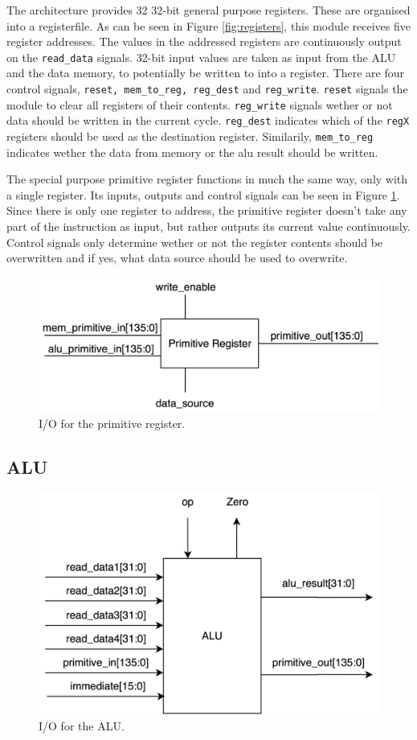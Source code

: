 The \vthreek architecture provides 32 32-bit general purpose registers.
These are organised into a registerfile.
As can be seen in Figure \ref{fig:registers}, this module receives five register addresses.
The values in the addressed registers are continuously output on the \texttt{read\_data} signals.
32-bit input values are taken as input from the ALU and the data memory, to potentially be written to into a register.
There are four control signals, \texttt{reset, mem\_to\_reg, reg\_dest} and \texttt{reg\_write}.
\texttt{reset} signals the module to clear all registers of their contents.
\texttt{reg\_write} signals wether or not data should be written in the current cycle.
\texttt{reg\_dest} indicates which of the \texttt{regX} registers should be used as the destination register.
Similarily, \texttt{mem\_to\_reg} indicates wether the data from memory or the alu result should be written.

The special purpose primitive register functions in much the same way, only with a single register.
Its inputs, outputs and control signals can be seen in Figure \ref{fig:primitive-register}.
Since there is only one register to address, the primitive register doesn't take any part of the instruction as input, but rather outputs its current value continuously.
Control signals only determine wether or not the register contents should be overwritten and if yes, what data source should be used to overwrite.

\begin{figure}[h!]
    \includegraphics[width=0.6\linewidth]{images/primitive-register.png}
    \caption{I/O for the primitive register.}
    \label{fig:primitive-register}
\end{figure}

\subsection{ALU}

\begin{figure}[h!]
    \includegraphics[width=0.8\linewidth]{images/ALU.png}
    \caption{I/O for the ALU.}
    \label{fig:ALU}
\end{figure}

